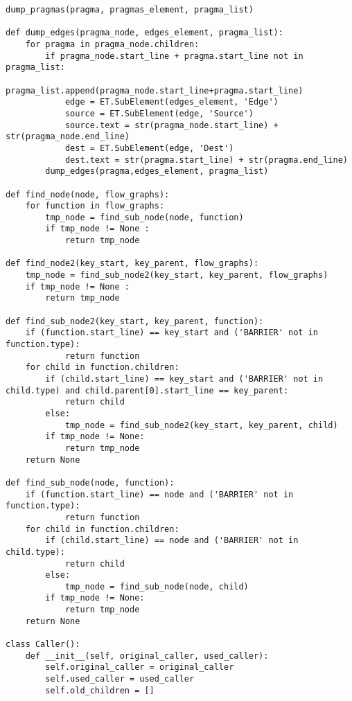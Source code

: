 \documentclass[a4paper,10pt,twoside]{book}
\begin{document}
\begin{lstlisting}[language=CCC, caption=pargraph.py]
		dump_pragmas(pragma, pragmas_element, pragma_list)

def dump_edges(pragma_node, edges_element, pragma_list):
	for pragma in pragma_node.children:
		if pragma_node.start_line + pragma.start_line not in pragma_list:
			pragma_list.append(pragma_node.start_line+pragma.start_line)
			edge = ET.SubElement(edges_element, 'Edge')
			source = ET.SubElement(edge, 'Source')
			source.text = str(pragma_node.start_line) + str(pragma_node.end_line)
			dest = ET.SubElement(edge, 'Dest')
			dest.text = str(pragma.start_line) + str(pragma.end_line)
		dump_edges(pragma,edges_element, pragma_list)

def find_node(node, flow_graphs):
	for function in flow_graphs:
		tmp_node = find_sub_node(node, function) 
		if tmp_node != None :
			return tmp_node

def find_node2(key_start, key_parent, flow_graphs):
	tmp_node = find_sub_node2(key_start, key_parent, flow_graphs) 
	if tmp_node != None :
		return tmp_node

def find_sub_node2(key_start, key_parent, function):
	if (function.start_line) == key_start and ('BARRIER' not in function.type):
			return function
	for child in function.children:
		if (child.start_line) == key_start and ('BARRIER' not in child.type) and child.parent[0].start_line == key_parent:
			return child
		else:
			tmp_node = find_sub_node2(key_start, key_parent, child)
		if tmp_node != None:
			return tmp_node
	return None

def find_sub_node(node, function):
	if (function.start_line) == node and ('BARRIER' not in function.type):
			return function
	for child in function.children:
		if (child.start_line) == node and ('BARRIER' not in child.type):
			return child
		else:
			tmp_node = find_sub_node(node, child)
		if tmp_node != None:
			return tmp_node
	return None

class Caller():
	def __init__(self, original_caller, used_caller):
		self.original_caller = original_caller
		self.used_caller = used_caller
		self.old_children = []


\end{lstlisting}
\end{document}
